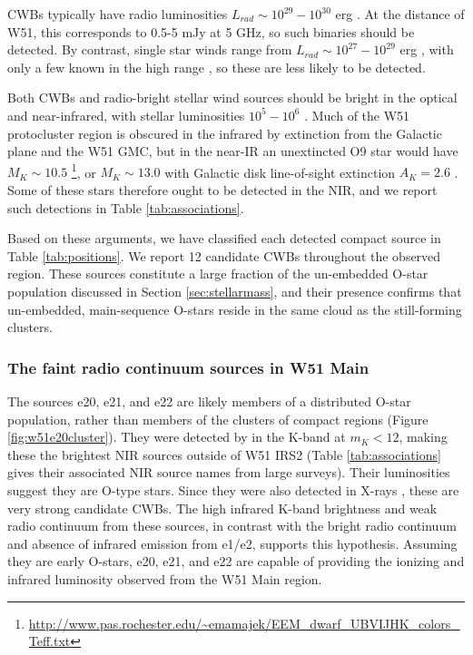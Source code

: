CWBs typically have radio luminosities
$L_{rad}\sim10^{29}-10^{30}$ erg \pers \citep{De-Becker2013a}.   At the
distance of W51, this corresponds to 0.5-5 mJy at 5 GHz, so such binaries
should be detected.  By contrast, single star winds range from $L_{rad} \sim
10^{27}-10^{29}$ erg \pers, with only a few known in the high range
\citep{Bieging1989a}, so these are less likely to be detected.

Both CWBs and radio-bright stellar wind sources should be bright in the
optical and near-infrared, with stellar luminosities $10^5-10^6$ \lsun.
Much of the W51 protocluster region is obscured in the infrared by extinction
from the Galactic plane and the W51 GMC, but in the near-IR an unextincted O9
star would have
$M_K\sim10.5$
\citep{Pecaut2013a}\footnote{\url{http://www.pas.rochester.edu/~emamajek/EEM_dwarf_UBVIJHK_colors_Teff.txt}},
or $M_K\sim 13.0$ with Galactic disk line-of-sight extinction $A_K=2.6$
\citep{Goldader1994a}.  Some of these stars therefore ought to be detected in
the NIR, and we report such detections in Table \ref{tab:associations}.

Based on these arguments, we have classified each detected compact source in
Table \ref{tab:positions}.  We report 12 candidate CWBs throughout the observed
region.  These sources constitute a large fraction of the un-embedded O-star
population discussed in Section \ref{sec:stellarmass}, and their presence confirms
that un-embedded, main-sequence O-stars reside in the same cloud as the still-forming
clusters.

\subsubsection{The faint radio continuum sources in W51 Main}

The sources e20, e21, and e22 are likely members of a distributed O-star
population, rather than members of the clusters of compact \hii regions (Figure
\ref{fig:w51e20cluster}).  They were detected by \citet{Goldader1994a} in the
K-band at $m_K < 12$, making these the brightest NIR sources outside of W51
IRS2 (Table \ref{tab:associations} gives their associated NIR source names
from large surveys).  Their luminosities suggest they are O-type stars.  Since
they were also detected in X-rays \citep{Townsley2014a}, these are very strong
candidate CWBs.  The high infrared K-band brightness and weak radio
continuum from these sources, in contrast with the bright radio continuum and
absence of infrared emission from e1/e2, supports this hypothesis.  
Assuming they are early O-stars, e20, e21, and e22 are capable of providing the
ionizing and infrared luminosity observed from the W51 Main \hii region.

